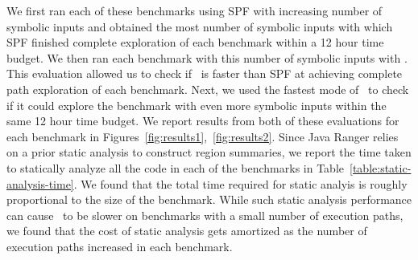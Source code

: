 We first ran each of these benchmarks using SPF with increasing number of symbolic inputs and obtained the most number
of symbolic inputs with which SPF finished complete exploration of each benchmark within a 12 hour time budget.
%
We then ran each benchmark with this number of symbolic inputs with \tool.
%
This evaluation allowed us to check if \tool\ is faster than SPF at achieving complete path exploration of each benchmark.
%
Next, we used the fastest mode of \tool\ to check if it could explore the benchmark with even more symbolic inputs within
the same 12 hour time budget.
%
We report results from both of these evaluations for each benchmark in Figures~\ref{fig:results1},~\ref{fig:results2}.
%
Since Java Ranger relies on a prior static analysis to construct region summaries, we report the time taken to statically
analyze all the code in each of the benchmarks in Table~\ref{table:static-analysis-time}.
%
We found that the total time required for static analyis is roughly proportional to the size of the benchmark.
%
While such static analysis performance can cause \tool\ to be slower on benchmarks with a small number of execution
paths, we found that the cost of static analysis gets amortized as the number of execution paths increased in each benchmark.
%
